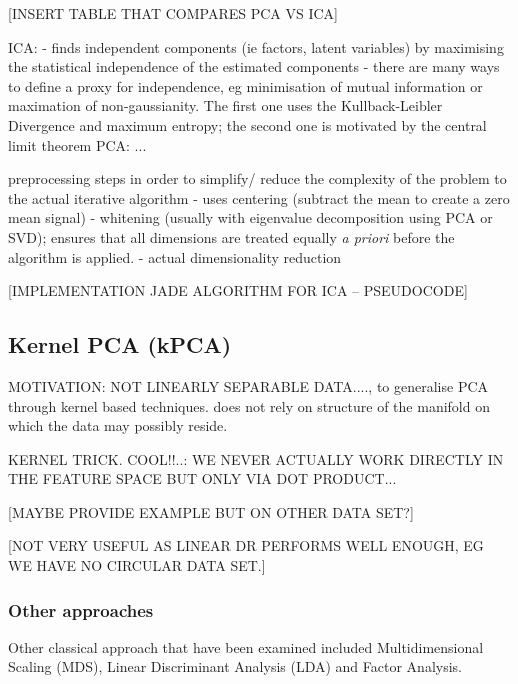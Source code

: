 \documentclass[journal, a4paper]{IEEEtran}
\begin{document}
[INSERT TABLE THAT COMPARES PCA VS ICA] 



ICA:
- finds independent components (ie factors, latent variables) by maximising the statistical independence of the estimated components
- there are many ways to define a proxy for independence, eg minimisation of mutual information or maximation of non-gaussianity. The first one uses the Kullback-Leibler Divergence and maximum entropy; the second one is motivated by the central limit theorem %
PCA:
...

preprocessing steps in order to simplify/ reduce the complexity of the problem to the actual iterative algorithm
- uses centering (subtract the mean to create a zero mean signal)
- whitening (usually with eigenvalue decomposition using PCA or SVD); ensures that all dimensions are treated equally \textit{a priori} before the algorithm is applied. 
- actual dimensionality reduction 


[IMPLEMENTATION JADE ALGORITHM FOR ICA -- PSEUDOCODE]



\subsection{Kernel PCA (kPCA)}

MOTIVATION: NOT LINEARLY SEPARABLE DATA...., to generalise PCA through kernel based techniques. does not rely on structure of the manifold on which the data may possibly reside. 

KERNEL TRICK. COOL!!..: WE NEVER ACTUALLY WORK DIRECTLY IN THE FEATURE SPACE BUT ONLY VIA DOT PRODUCT...


[MAYBE PROVIDE EXAMPLE BUT ON OTHER DATA SET?]

[NOT VERY USEFUL AS LINEAR DR PERFORMS WELL ENOUGH, EG WE HAVE NO CIRCULAR DATA SET.] 


\subsubsection{Other approaches}

Other classical approach that have been examined included Multidimensional Scaling (MDS), Linear Discriminant Analysis (LDA) and Factor Analysis. 
\end{document}
